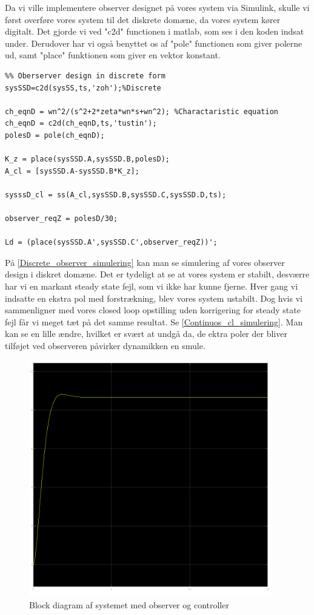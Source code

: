 Da vi ville implementere observer designet på vores system via Simulink, skulle vi først overføre vores system til det diskrete domæne, da vores system kører digitalt. Det gjorde vi ved "c2d" functionen i matlab, som ses i den koden indsat under. Derudover har vi også benyttet os af "pole" functionen som giver polerne ud, samt "place" funktionen som giver en vektor konstant.

\begin{lstlisting}
%% Oberserver design in discrete form
sysSSD=c2d(sysSS,ts,'zoh');%Discrete

ch_eqnD = wn^2/(s^2+2*zeta*wn*s+wn^2); %Charactaristic equation
ch_eqnD = c2d(ch_eqnD,ts,'tustin');
polesD = pole(ch_eqnD);

K_z = place(sysSSD.A,sysSSD.B,polesD);
A_cl = [sysSSD.A-sysSSD.B*K_z];

sysssD_cl = ss(A_cl,sysSSD.B,sysSSD.C,sysSSD.D,ts);

observer_reqZ = polesD/30;

Ld = (place(sysSSD.A',sysSSD.C',observer_reqZ))';
\end{lstlisting}


På \autoref{Discrete_observer_simulering} kan man se simulering af vores observer design i diskret domæne. Det er tydeligt at se at vores system er stabilt, desværre har vi en markant steady state fejl, som vi ikke har kunne fjerne. Hver gang vi indsatte en ekstra pol med forstrækning, blev vores system ustabilt. Dog hvis vi sammenligner med vores closed loop opstilling uden korrigering for steady state fejl får vi meget tæt på det samme resultat. Se \autoref{Continuos_cl_simulering}. Man kan se en lille ændre, hvilket er svært at undgå da, de ektra poler der bliver tilføjet ved observeren påvirker dynamikken en smule.


\begin{figure}[H]
	\centering
	\includegraphics[width = 300pt]{Img/Discrete_observer_simulering.png}
	\caption{Block diagram af systemet med observer og controller}
	\label{Discrete_observer_simulering}
\end{figure}


